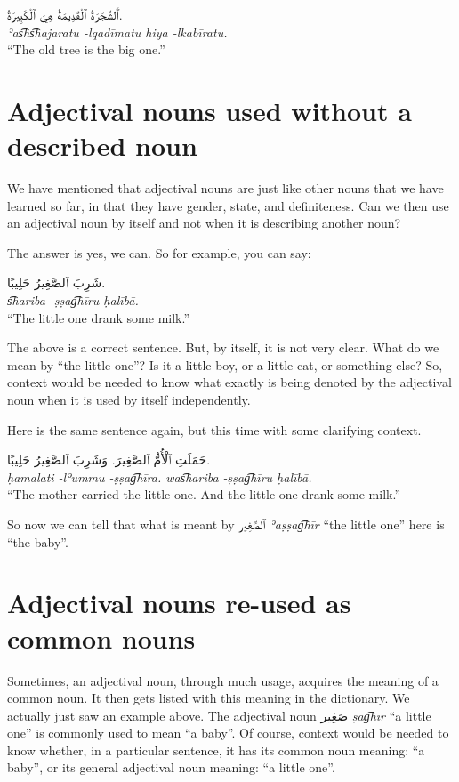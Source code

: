 \documentclass[
  10pt,
]{book}
\begin{document}
\foreignlanguage{arabic}{ٱَلشَّجَرَةُ ٱلْقَدِيمَةُ هِيَ ٱلْکَبِيرَةُ.}\\
\emph{ʾas͡hs͡hajaratu -lqadīmatu hiya -lkabīratu.}\\
\enquote{The old tree is the big one.}

\section{Adjectival nouns used without a described noun}\label{adjectival-nouns-used-without-a-described-noun}

We have mentioned that adjectival nouns are just like other nouns that we have learned so far, in that they have gender, state, and definiteness. Can we then use
an adjectival noun by itself and not when it is describing another noun?

The answer is yes, we can. So for example, you can say:

\foreignlanguage{arabic}{شَرِبَ ٱلصَّغِيرُ حَلِيبًا.}\\
\emph{s͡hariba -ṣṣag͡hīru ḥalībā.}\\
\enquote{The little one drank some milk.}

The above is a correct sentence. But, by itself, it is not very clear. What do we mean by \enquote{the little one}? Is it a little boy, or a little cat, or something else? So, context would be needed to know what exactly is being denoted by the adjectival noun when it is used by itself independently.

Here is the same sentence again, but this time with some clarifying context.

\foreignlanguage{arabic}{حَمَلَتِ ٱلْأُمُّ ٱلصَّغِيرَ. وَشَرِبَ ٱلصَّغِيرُ حَلِيبًا.}\\
\emph{ḥamalati -lʾummu -ṣṣag͡hīra. was͡hariba -ṣṣag͡hīru ḥalībā.}\\
\enquote{The mother carried the little one. And the little one drank some milk.}

So now we can tell that what is meant by \foreignlanguage{arabic}{ٱلصَّغِير} \emph{ʾaṣṣag͡hīr} \enquote{the little one} here is \enquote{the baby}.

\section{Adjectival nouns re-used as common nouns}\label{adjectival-nouns-re-used-as-common-nouns}

Sometimes, an adjectival noun, through much usage, acquires the meaning of a common noun. It then gets listed with this meaning in the dictionary. We actually just saw an example above. The adjectival noun
\foreignlanguage{arabic}{صَغِير} \emph{ṣag͡hīr} \enquote{a little one} is commonly used to mean \enquote{a baby}. Of course, context would be needed to know whether, in a particular sentence, it has its common noun meaning: \enquote{a baby}, or its general adjectival noun meaning: \enquote{a little one}.
\end{document}
